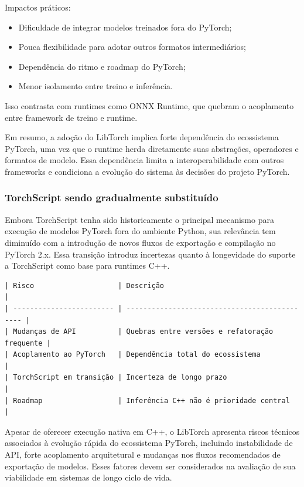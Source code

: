 Impactos práticos: 

\begin{itemize} 
    \item Dificuldade de integrar modelos treinados fora do PyTorch;
    \item Pouca flexibilidade para adotar outros formatos intermediários;
    \item Dependência do ritmo e roadmap do PyTorch;
    \item Menor isolamento entre treino e inferência.
\end{itemize}

Isso contrasta com runtimes como ONNX Runtime, que quebram o acoplamento entre framework de treino e runtime.

Em resumo, a adoção do LibTorch implica forte dependência do ecossistema PyTorch, uma vez que o runtime herda diretamente suas abstrações, operadores e formatos de modelo. Essa dependência limita a interoperabilidade com outros frameworks e condiciona a evolução do sistema às decisões do projeto PyTorch.

\subsubsection{TorchScript sendo gradualmente substituído}

Embora TorchScript tenha sido historicamente o principal mecanismo para execução de modelos PyTorch fora do ambiente Python, sua relevância tem diminuído com a introdução de novos fluxos de exportação e compilação no PyTorch 2.x. Essa transição introduz incertezas quanto à longevidade do suporte a TorchScript como base para runtimes C++.
\begin{verbatim}
| Risco                    | Descrição                                     |
| ------------------------ | --------------------------------------------- |
| Mudanças de API          | Quebras entre versões e refatoração frequente |
| Acoplamento ao PyTorch   | Dependência total do ecossistema              |
| TorchScript em transição | Incerteza de longo prazo                      |
| Roadmap                  | Inferência C++ não é prioridade central       |
\end{verbatim}

Apesar de oferecer execução nativa em C++, o LibTorch apresenta riscos técnicos associados à evolução rápida do ecossistema PyTorch, incluindo instabilidade de API, forte acoplamento arquitetural e mudanças nos fluxos recomendados de exportação de modelos. Esses fatores devem ser considerados na avaliação de sua viabilidade em sistemas de longo ciclo de vida.

